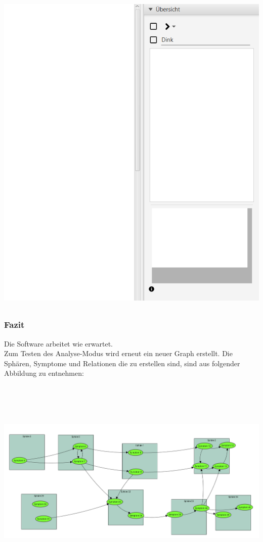 \documentclass[enabledeprecatedfontcommands]{scrartcl}
\begin{document}
\begin{center}
\includegraphics[height=16cm]{sphareMitRechsklickLoeschen.PNG}
\end{center}
\subsubsection{Fazit}
Die Software arbeitet wie erwartet. \\

Zum Testen des Analyse-Modus wird erneut ein neuer Graph erstellt. Die Sphären, Symptome und Relationen die zu erstellen sind, sind aus folgender Abbildung zu entnehmen: 
\begin{center}
\includegraphics[height=10cm, angle=90]{analysezuErstellenderGraph.PNG}
\end{center}
\newpage
\end{document}
